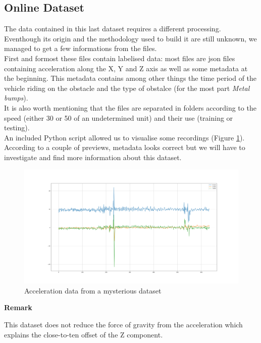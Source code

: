 \subsection{Online Dataset}
The data contained in this last dataset requires a different processing. Eventhough its origin and the methodology used to build it are still unknown, we managed to get a few informations from the files.\\
First and formost these files contain labelised data: most files are \textsf{json} files containing acceleration along the X, Y and Z axis as well as some metadata at the beginning. This metadata contains among other things the time period of the vehicle riding on the obstacle and the type of obstalce (for the most part \textit{Metal bumps}).\\
It is also worth mentioning that the files are separated in folders according to the speed (either 30 or 50 of an undetermined unit) and their use (training or testing).\\

An included Python script allowed us to visualise some recordings (Figure \ref{online_bumps}). According to a couple of previews, metadata looks correct but we will have to investigate and find more information about this dataset.\\

\begin{figure}
    \center
    \includegraphics[scale=.25]{img/online_bumps.png}
    \caption{Acceleration data from a mysterious dataset}
    \label{online_bumps}
\end{figure}

\noindent
\begin{minipage}[!hc]{0.12\textwidth}
   \textbf{Remark}
\end{minipage}
\vrule\enskip\vrule\quad\begin{minipage}{\dimexpr 0.87\textwidth-0.8pt-1.5em}
This dataset does not reduce the force of gravity from the acceleration which explains the close-to-ten offset of the Z component.
\end{minipage}